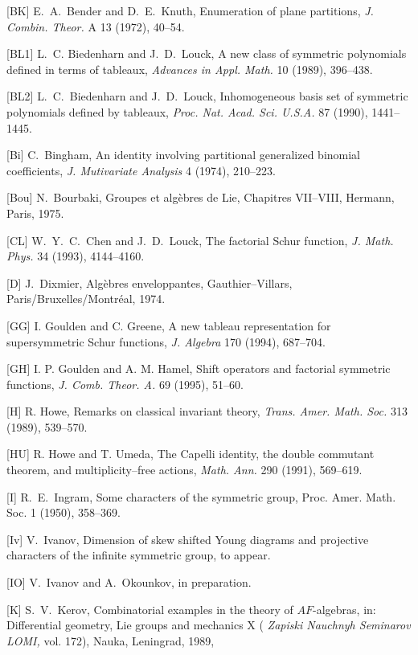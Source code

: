 \item{[BK]} {\smc E.~A.~Bender and D.~E.~Knuth,} Enumeration of plane
partitions, {\it J. Combin. Theor.\/} A 13 (1972), 40--54.
\item{[BL1]} {\smc L.~C. Biedenharn and J.~D.~Louck}, A new class of 
symmetric 
polynomials defined in terms of tableaux, {\it Advances in Appl. Math.\/} 
10 
(1989), 396--438. 
\item{[BL2]} {\smc L.~C.~Biedenharn and J.~D.~Louck,} Inhomogeneous 
basis set of symmetric polynomials defined by tableaux, {\it Proc. Nat. 
Acad.
Sci.   U.S.A.\/} 87 (1990), 1441--1445.
\item{[Bi]} {\smc C.~Bingham,}  An identity involving partitional 
generalized  binomial coefficients, {\it J. Mutivariate Analysis\/} 4
(1974), 210--223.
\item{[Bou]} {\smc N.~Bourbaki,} Groupes et alg\`ebres de Lie, Chapitres
VII--VIII, Hermann, Paris, 1975.
\item{[CL]} {\smc W.~Y.~C.~Chen and J.~D.~Louck,}  
The factorial Schur function,  
{\it J. Math. Phys.\/} 34 (1993), 4144--4160. 
\item{[D]} {\smc J.~Dixmier,} Alg\`ebres enveloppantes, Gauthier--Villars,
Paris/Bruxelles/Mont\-r\'eal, 1974.
\item{[GG]} {\smc I. Goulden and C. Greene,} A new tableau 
representation for supersymmetric Schur functions, {\it J. Algebra\/} 170
(1994), 687--704. 
\item{[GH]} {\smc I. P. Goulden and A. M. Hamel,} 
Shift operators and factorial symmetric functions, 
{\it J. Comb. Theor. A.\/} 69 (1995), 51--60. 
\item{[H]} {\smc R. Howe,} Remarks on classical invariant theory,  
{\it Trans. Amer. Math. Soc.\/} 313 (1989), 539--570. 
\item{[HU]} {\smc R. Howe and T. Umeda,}  
The Capelli identity, the double commutant theorem, and  
multiplicity--free actions, {\it Math. Ann.\/} 290 (1991), 
569--619.
\item{[I]} {\smc R.~E.~Ingram,} Some characters of the symmetric group,
Proc. Amer. Math. Soc. 1 (1950), 358--369.  
\item{[Iv]} {\smc V.~Ivanov,} Dimension of skew shifted Young diagrams
and projective characters of the infinite symmetric group, to appear.
\item{[IO]} {\smc V.~Ivanov and A.~Okounkov,} in preparation.
\item{[K]} {\smc S.~V.~Kerov,} Combinatorial examples in the theory of 
$AF$-algebras, in: Differential geometry, Lie groups and mechanics X ({\it 
Zapiski Nauchnyh Seminarov LOMI,\/} vol. 172), Nauka, Leningrad, 1989, 
